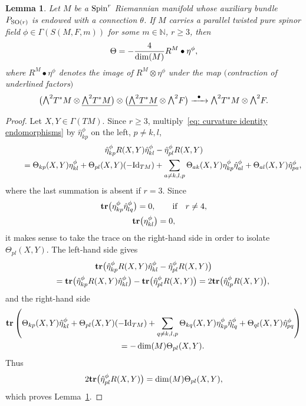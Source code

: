 \documentclass[10pt,a4paper]{amsart}
\newcommand{\ext}{\raise1pt\hbox{\small$\bigwedge$}}
\newcommand{\tr}{\mbox{\bf tr}}
\numberwithin{equation}{section}
\newtheorem{Lemma}[Theorem]{Lemma}
\begin{document}
\begin{Lemma}\label{Lemma4.6} Let $M$ be a ${\rm Spin}^r$ Riemannian manifold whose auxiliary bundle $P_{{\rm SO}(r)}$ is endowed with a connection $\theta$. If $M$ carries a parallel twisted pure spinor field $\phi\in\Gamma(S(M,F,m))$ for some $m\in\mathbb{N}$, $r\geq 3$, then
\begin{gather}
\Theta=-{4\over \dim(M)}R^M\bullet \eta^\phi,\label{eq: first version second SW equation}
\end{gather}
where $R^M\bullet \eta^\phi$ denotes the image of $R^M\otimes \eta^\phi$ under the map $($contraction of underlined factors$)$
\begin{gather*}
\big(\ext^2 T^*M\otimes \underline{\ext^2 T^*M}\big)\otimes\big(\underline{\ext^2 T^*M}\otimes\ext^2 F\big)
 \xrightarrow{\,\,\,\,\bullet\,\,\,\,} \ext^2 T^*M\otimes\ext^2 F.
\end{gather*}
\end{Lemma}
\begin{proof} Let $X,Y\in\Gamma(TM)$. Since $r\geq 3$, multiply~\eqref{eq: curvature identity endomorphisms} by $\hat{\eta}^\phi_{kp}$ on the left, $p\not = k,l$,
\begin{gather*}
\hat{\eta}^\phi_{kp}{R(X,Y)}\hat{\eta}^\phi_{kl}-\hat{\eta}^\phi_{pl}{R(X,Y)} \\
\qquad {} = \Theta_{kp}(X,Y)\eta_{kl}^\phi + \Theta_{pl}(X,Y)(-{\rm Id}_{TM}) + \sum_{a\not= k,l,p} \Theta_{ak}(X,Y) \eta_{kp}^\phi\hat{\eta}^\phi_{al}+ \Theta_{al}(X,Y)\hat{\eta}^\phi_{pa},
\end{gather*}
where the last summation is absent if $r=3$. Since
\begin{gather*}
\tr\big(\eta_{kp}^\phi\hat{\eta}^\phi_{lq}\big) = 0, \qquad \text{if} \quad r\not = 4,\\
\tr\big(\eta_{kl}^\phi\big) = 0,
\end{gather*}
it makes sense to take the trace on the right-hand side in order to isolate $\Theta_{pl}(X,Y)$. The left-hand side gives
\begin{gather*}
\tr\big(\hat{\eta}^\phi_{kp}{R(X,Y)}\hat{\eta}^\phi_{kl}-\hat{\eta}^\phi_{pl}{R(X,Y)}\big)\\
\qquad {} =
\tr\big(\hat{\eta}^\phi_{kp}{R(X,Y)}\hat{\eta}^\phi_{kl}\big)-\tr\big(\hat{\eta}^\phi_{pl}{R(X,Y)}\big)
 = 2\tr\big(\hat{\eta}^\phi_{lp}{R(X,Y)}\big),
\end{gather*}
and the right-hand side
\begin{gather*}
\tr\left(\Theta_{kp}(X,Y)\hat\eta_{kl}^\phi + \Theta_{pl}(X,Y)(-{\rm Id}_{TM})
 + \sum_{q\not= k,l,p} \Theta_{kq}(X,Y) \eta_{kp}^\phi\hat{\eta}^\phi_{lq}+ \Theta_{ql}(X,Y)\hat{\eta}^\phi_{pq}\right)\\
 \qquad{} = -\dim(M)\Theta_{pl}(X,Y).
\end{gather*}
Thus
\begin{gather}
2\tr\big(\hat{\eta}^\phi_{pl}{R(X,Y)}\big)=\dim(M)\Theta_{pl}(X,Y), \label{eq: isolation Theta}
\end{gather}
which proves Lemma~\ref{Lemma4.6}.
\end{proof}
\end{document}
